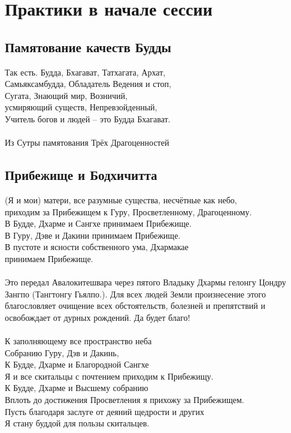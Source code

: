 \section{Практики в начале сессии}

\subsection{Памятование качеств Будды}
\small
Так есть. Будда, Бхагават, Татхагата, Архат,\\
Самьяксамбудда, Обладатель Ведения и стоп,\\
Сугата, Знающий мир, Возничий,\\
усмиряющий существ, Непревзойденный,\\
Учитель богов и людей – это Будда Бхагават.\\
\\
\scriptsize
Из Сутры памятования Трёх Драгоценностей
\small

\subsection{Прибежище и Бодхичитта}

(Я и мои) матери, все разумные существа, несчётные как небо,\\
приходим за Прибежищем к Гуру, Просветленному, Драгоценному.\\
В Будде, Дхарме и Сангхе принимаем Прибежище.\\
В Гуру, Дэве и Дакини принимаем Прибежище.\\
В пустоте и ясности собственного ума, Дхармакае \\ \indent принимаем Прибежище.\\
\\
\scriptsize
Это передал Авалокитешвара через пятого Владыку Дхармы
гелонгу Цондру Зангпо (Тангтонгу Гьялпо.).
Для всех людей Земли произнесение этого благословляет
очищение всех обстоятельств, болезней и препятствий
и освобождает от дурных рождений. Да будет благо!\\
\small
\\
К заполняющему все пространство неба\\
Собранию Гуру, Дэв и Дакинь, \\
К Будде, Дхарме и Благородной Сангхе\\
Я и все скитальцы с почтением приходим к Прибежищу.\\

К Будде, Дхарме и Высшему собранию\\
Вплоть до достижения Просветления я прихожу за Прибежищем.\\
Пусть благодаря заслуге от деяний щедрости и других\\
Я стану буддой для пользы скитальцев.\\


